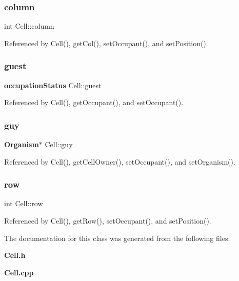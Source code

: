 \subsubsection{column}
{\footnotesize\ttfamily int Cell\+::column\hspace{0.3cm}{\ttfamily [private]}}



Referenced by Cell(), get\+Col(), set\+Occupant(), and set\+Position().

\mbox{\label{classCell_aafc273a5125cf29742a8df6f5a5a881c}} 
\subsubsection{guest}
{\footnotesize\ttfamily \textbf{ occupation\+Status} Cell\+::guest\hspace{0.3cm}{\ttfamily [private]}}



Referenced by Cell(), get\+Occupant(), and set\+Occupant().

\mbox{\label{classCell_a3620f64df751ce23697f6cac13dfc151}} 
\subsubsection{guy}
{\footnotesize\ttfamily \textbf{ Organism}$\ast$ Cell\+::guy\hspace{0.3cm}{\ttfamily [private]}}



Referenced by Cell(), get\+Cell\+Owner(), set\+Occupant(), and set\+Organism().

\mbox{\label{classCell_a85d2a7af6195f5196574790fbc1becfd}} 
\subsubsection{row}
{\footnotesize\ttfamily int Cell\+::row\hspace{0.3cm}{\ttfamily [private]}}



Referenced by Cell(), get\+Row(), set\+Occupant(), and set\+Position().



The documentation for this class was generated from the following files\+:\begin{DoxyCompactItemize}
\item 
\textbf{ Cell.\+h}\item 
\textbf{ Cell.\+cpp}\end{DoxyCompactItemize}

